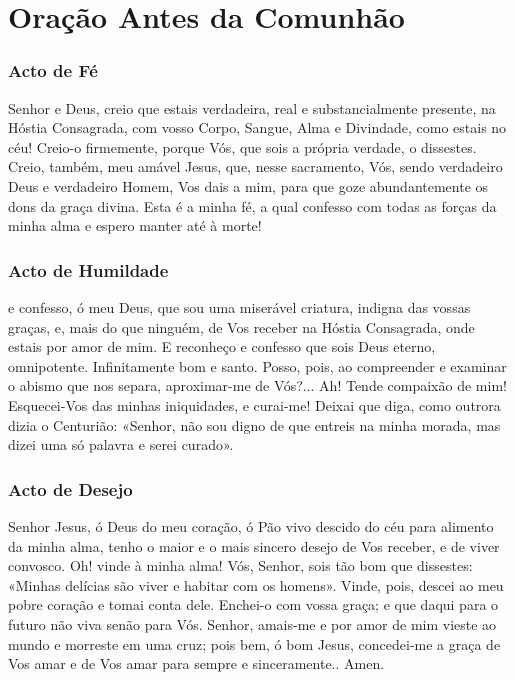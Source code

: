 \section{Oração Antes da Comunhão}\label{oracaoantescomunhao}

\subsubsection{Acto de Fé}

 Senhor e Deus, creio que estais verdadeira, real e substancialmente presente, na Hóstia Consagrada, com vosso Corpo, Sangue, Alma e Divindade, como estais no céu! Creio-o firmemente, porque Vós, que sois a própria verdade, o dissestes. Creio, também, meu amável Jesus, que, nesse sacramento, Vós, sendo verdadeiro Deus e verdadeiro Homem, Vos dais a mim, para que goze abundantemente os dons da graça divina. Esta é a minha fé, a qual confesso com todas as forças da minha alma e espero manter até à morte!

\subsubsection{Acto de Humildade}
 e confesso, ó meu Deus, que sou uma miserável criatura, indigna das vossas graças, e, mais do que ninguém, de Vos receber na Hóstia Consagrada, onde estais por amor de mim. E reconheço e confesso que sois Deus eterno, omnipotente. Infinitamente bom e santo. Posso, pois, ao compreender e examinar o abismo que nos separa, aproximar-me de Vós?... Ah! Tende compaixão de mim! Esquecei-Vos das minhas iniquidades, e curai-me! Deixai que diga, como outrora dizia o Centurião: «Senhor, não sou digno de que entreis na minha morada, mas dizei uma só palavra e serei curado».

\subsubsection{Acto de Desejo}

 Senhor Jesus, ó Deus do meu coração, ó Pão vivo descido do céu para alimento da minha alma, tenho o maior e o mais sincero desejo de Vos receber, e de viver convosco. Oh! vinde à minha alma! Vós, Senhor, sois tão bom que dissestes: «Minhas delícias são viver e habitar com os homens». Vinde, pois, descei ao meu pobre coração e tomai conta dele. Enchei-o com vossa graça; e que daqui para o futuro não viva senão para Vós. Senhor, amais-me e por amor de mim vieste ao mundo e morreste em uma cruz; pois bem, ó bom Jesus, concedei-me a graça de Vos amar e de Vos amar para sempre e sinceramente.. Amen.

